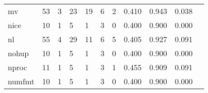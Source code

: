 \begin{longtable}{lp{1.2cm}p{1.2cm}p{1.2cm}p{1.2cm}p{1.2cm}p{1.2cm}p{1.2cm}p{1.2cm}p{1.2cm}p{1.2cm}}
mv        &                                    53 &                                                  3 &                                                 23 &                                                 19 &                                                  6 &                                                  2 &                                              0.410 &                                              0.943 &                                              0.038 \\
nice      &                                    10 &                                                  1 &                                                  5 &                                                  1 &                                                  3 &                                                  0 &                                              0.400 &                                              0.900 &                                              0.000 \\
nl        &                                    55 &                                                  4 &                                                 29 &                                                 11 &                                                  6 &                                                  5 &                                              0.405 &                                              0.927 &                                              0.091 \\
nohup     &                                    10 &                                                  1 &                                                  5 &                                                  1 &                                                  3 &                                                  0 &                                              0.400 &                                              0.900 &                                              0.000 \\
nproc     &                                    11 &                                                  1 &                                                  5 &                                                  1 &                                                  3 &                                                  1 &                                              0.455 &                                              0.909 &                                              0.091 \\
numfmt    &                                    10 &                                                  1 &                                                  5 &                                                  1 &                                                  3 &                                                  0 &                                              0.400 &                                              0.900 &                                              0.000 \\

\end{longtable}
